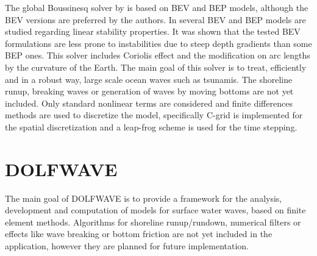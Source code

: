 The global Boussinesq solver by \citet{PedersenLovholt2008} is based
on BEV and BEP models, although the BEV versions are preferred by the
authors.  In \citet{LovholtPedersen2009} several BEV and BEP models
are studied regarding linear stability properties.  It was shown that
the tested BEV formulations are less prone to instabilities due to
steep depth gradients than some BEP ones.  This solver includes
Coriolis effect and the modification on arc lengths by the curvature
of the Earth. The main goal of this solver is to treat, efficiently
and in a robust way, large scale ocean waves such as tsunamis.  The
shoreline runup, breaking waves or generation of waves by moving
bottoms are not yet included.  Only standard nonlinear terms are
considered and finite differences methods are used to discretize the
model, specifically C-grid is implemented for the spatial
discretization and a leap-frog scheme is used for the time stepping.

\section{DOLFWAVE}
\label{sec:lopes:dolfwave}

The main goal of DOLFWAVE is to provide a framework for the analysis,
development and computation of models for surface water waves, based
on finite element methods. Algorithms for shoreline runup/rundown,
numerical filters or effects like wave breaking or bottom friction are
not yet included in the application, however they are planned for
future implementation.

